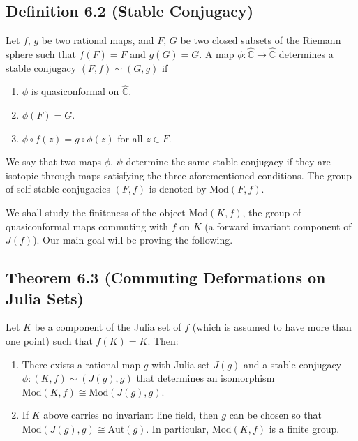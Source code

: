 \documentclass[11pt,a4paper]{article}
\begin{document}

    \subsection*{Definition 6.2 (Stable Conjugacy)} Let $f$, $g$ be two rational maps, and $F$, $G$ be two closed subsets of the Riemann sphere such that $f(F) = F$ and $g(G) = G$. A map $\phi:\hat{\mathbb{C}} \rightarrow \hat{\mathbb{C}}$ determines a stable conjugacy $(F, f) \sim (G, g)$ if
    \begin{enumerate}
        \item $\phi$ is quasiconformal on $\hat{\mathbb{C}}$.
        \item $\phi(F) = G$.
        \item $\phi \circ f(z) = g\circ \phi(z)$ for all $z\in F$.
    \end{enumerate}

    We say that two maps $\phi$, $\psi$ determine the same stable conjugacy if they are isotopic through maps satisfying the three aforementioned conditions. The group of self stable conjugacies $(F, f)$ is denoted by $\text{Mod}(F, f)$.


    We shall study the finiteness of the object $\text{Mod}(K, f)$, the group of quasiconformal maps commuting with $f$ on $K$ (a forward invariant component of $J(f)$). Our main goal will be proving the following.

    \subsection*{Theorem 6.3 (Commuting Deformations on Julia Sets)} Let $K$ be a component of the Julia set of $f$ (which is assumed to have more than one point) such that $f(K) = K$. Then:
    \begin{enumerate}
        \item There exists a rational map $g$ with Julia set $J(g)$ and a stable conjugacy $\phi:(K,f)\sim (J(g), g)$ that determines an isomorphism $\text{Mod}(K, f) \cong \text{Mod}(J(g), g)$.
        \item If $K$ above carries no invariant line field, then $g$ can be chosen so that $\text{Mod}(J(g), g) \cong \text{Aut}(g)$. In particular, $\text{Mod}(K, f)$ is a finite group.
    \end{enumerate}
\end{document}
